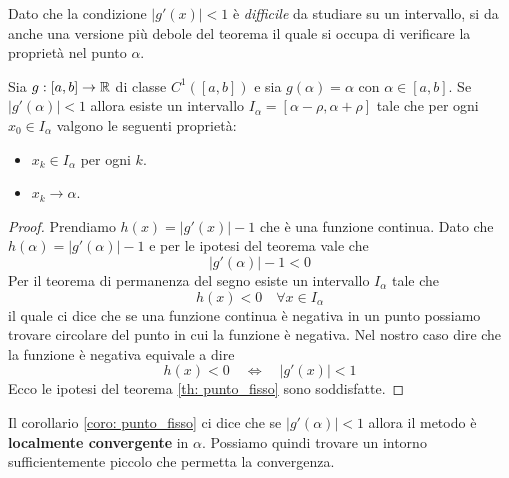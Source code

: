 Dato che la condizione $|g'(x)| < 1$ è \emph{difficile} da studiare su un intervallo, si da anche una versione
più debole del teorema il quale si occupa di verificare la proprietà nel punto $\alpha$.

\begin{corollary}\label{coro: punto_fisso}
	Sia $g : [a, b] \to \mathbb{R}$ di classe $C^1 ([a, b])$ e sia $g(\alpha) = \alpha$ con $\alpha \in [a,b]$. Se
	$|g'(\alpha)| < 1$ allora esiste un intervallo $I_\alpha = [\alpha - \rho, \alpha + \rho]$ tale che per
	ogni $x_0 \in I_\alpha$ valgono le seguenti proprietà:
	\begin{itemize}
		\item $x_k \in I_\alpha$ per ogni $k$.
		\item $x_k \to \alpha$.
	\end{itemize}
	\begin{proof}
		Prendiamo $h(x) = |g'(x)| - 1$ che è una funzione continua. Dato che $h(\alpha) = |g'(\alpha)| - 1$ e
		per le ipotesi del teorema vale che
		\[ |g'(\alpha)| - 1 < 0 \]
		Per il teorema di permanenza del segno esiste un intervallo $I_\alpha$ tale che
		\[ h(x) < 0 \quad \forall x \in I_\alpha \]
		il quale ci dice che se una funzione continua è negativa in un punto possiamo trovare circolare del punto
		in cui la funzione è negativa. Nel nostro caso dire che la funzione è negativa equivale a dire
		\[ h(x) < 0 \quad \Leftrightarrow \quad |g'(x)| < 1 \]
		Ecco le ipotesi del teorema \ref{th: punto_fisso} sono soddisfatte.
	\end{proof}
\end{corollary}

Il corollario \ref{coro: punto_fisso} ci dice che se $|g'(\alpha)| < 1$ allora il metodo è
\textbf{localmente convergente} in $\alpha$. Possiamo quindi trovare un intorno sufficientemente piccolo che
permetta la convergenza.

